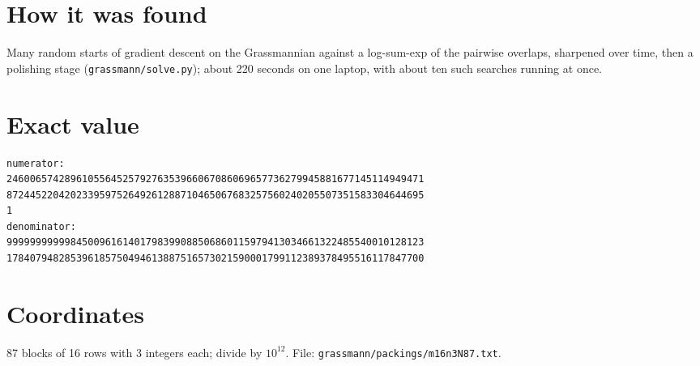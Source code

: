 \documentclass[11pt,a4paper]{article}
\begin{document}
\section{How it was found}
Many random starts of gradient descent on the Grassmannian against a log-sum-exp of the pairwise overlaps, sharpened over time, then a polishing stage (\texttt{grassmann/solve.py}); about 220 seconds on one laptop, with about ten such searches running at once.


\appendix
\section{Exact value}
{\small
\begin{verbatim}
numerator:
246006574289610556452579276353966067086069657736279945881677145114949471
872445220420233959752649261288710465067683257560240205507351583304644695
1
denominator:
999999999998450096161401798399088506860115979413034661322485540010128123
178407948285396185750494613887516573021590001799112389378495516117847700
\end{verbatim}}

\section{Coordinates}
87 blocks of 16 rows with 3 integers each; divide by $10^{12}$. File: \texttt{grassmann/packings/m16n3N87.txt}.
{\tiny
\begin{multicols}{3}
\end{multicols}}
\end{document}
